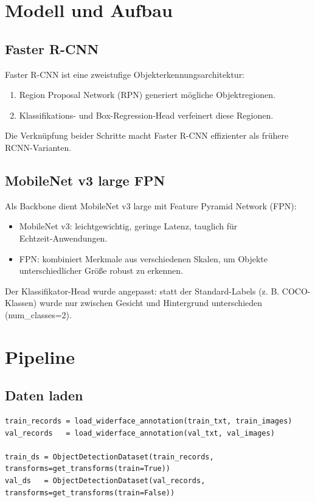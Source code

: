 \documentclass[11pt,a4paper]{article}
\begin{document}
\section{Modell und Aufbau}
\subsection{Faster R-CNN}
Faster R-CNN ist eine zweistufige Objekterkennungsarchitektur:
\begin{enumerate}
\item Region Proposal Network (RPN) generiert mögliche Objektregionen.
\item Klassifikations- und Box-Regression-Head verfeinert diese Regionen.
\end{enumerate}
Die Verknüpfung beider Schritte macht Faster R-CNN effizienter als frühere RCNN-Varianten.

\subsection{MobileNet v3 large FPN}
Als Backbone dient MobileNet v3 large mit Feature Pyramid Network (FPN):
\begin{itemize}
\item MobileNet v3: leichtgewichtig, geringe Latenz, tauglich für Echtzeit‑Anwendungen.
\item FPN: kombiniert Merkmale aus verschiedenen Skalen, um Objekte unterschiedlicher Größe robust zu erkennen.
\end{itemize}
Der Klassifikator-Head wurde angepasst: statt der Standard-Labels (z. B. COCO-Klassen) wurde nur zwischen Gesicht und Hintergrund unterschieden (num\_classes=2).

\section{Pipeline}
\subsection{Daten laden}
\begin{lstlisting}
train_records = load_widerface_annotation(train_txt, train_images)
val_records   = load_widerface_annotation(val_txt, val_images)

train_ds = ObjectDetectionDataset(train_records, transforms=get_transforms(train=True))
val_ds   = ObjectDetectionDataset(val_records, transforms=get_transforms(train=False))
\end{lstlisting}
\end{document}
